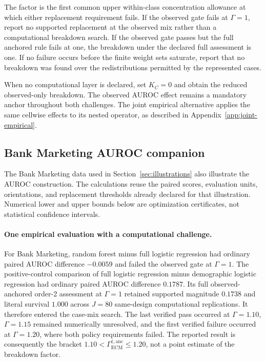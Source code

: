 \documentclass[11pt]{article}
\theoremstyle{remark}
\begin{document}
The factor is the first common upper within-class concentration allowance at
which either replacement requirement fails. If the observed gate fails at
$\Gamma=1$, report no supported replacement at the observed mix rather than a
computational breakdown search. If the observed gate passes but the full
anchored rule fails at one, the breakdown under the declared full assessment
is one. If no failure occurs before the finite weight sets saturate, report that
no breakdown was found over the redistributions permitted by the represented
cases.

When no computational layer is declared, set $K_C=0$ and obtain the reduced
observed-only breakdown. The observed AUROC effect remains a mandatory anchor throughout both
challenges. The joint empirical alternative applies the same cellwise effects
to its nested operator, as described in Appendix~\ref{app:joint-empirical}.

\subsection{Bank Marketing AUROC companion}
\label{app:auroc-illustrations}

The Bank Marketing data used in Section~\ref{sec:illustrations} also
illustrate the AUROC construction. The calculations reuse the paired scores,
evaluation units, orientations, and replacement thresholds already declared
for that illustration. Numerical lower and upper bounds below are optimization
certificates, not statistical confidence intervals.

\paragraph{One empirical evaluation with a computational challenge.}
For Bank Marketing, random forest minus full logistic regression had ordinary
paired AUROC difference $-0.0059$ and failed the observed gate at
$\Gamma=1$. The positive-control comparison of full logistic regression minus
demographic logistic regression had ordinary paired AUROC difference $0.1787$.
Its full observed-anchored order-2 assessment at $\Gamma=1$ retained supported
magnitude $0.1738$ and literal survival $1.000$ across $J=80$ same-design
computational replications. It therefore entered the case-mix search. The last
verified pass occurred at $\Gamma=1.10$, $\Gamma=1.15$ remained numerically
unresolved, and the first verified failure occurred at $\Gamma=1.20$, where
both policy requirements failed. The reported result is consequently the
bracket $1.10<\Gamma_{\mathrm{ECM}}^{\dagger,\mathrm{anc}}\leq1.20$, not a
point estimate of the breakdown factor.
\end{document}
